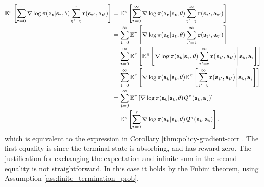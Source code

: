 \begin{equation*}
\begin{split}
    \mathbb{E}^{\pi}\left[ \sum_{{\tt t}=0}^\tau \nabla\log \pi({\tt a}_{\tt t}|{\tt s}_{\tt t},\theta) \sum_{{\tt t}'={\tt t}}^\tau {\tt r}({\tt s}_{{\tt t}'},{\tt a}_{{\tt t}'})\right] &= \mathbb{E}^{\pi}\left[ \sum_{{\tt t}=0}^\infty \nabla\log \pi({\tt a}_{\tt t}|{\tt s}_{\tt t},\theta) \sum_{{\tt t}'={\tt t}}^\infty {\tt r}({\tt s}_{{\tt t}'},{\tt a}_{{\tt t}'})\right] \\
    &= \sum_{{\tt t}=0}^\infty \mathbb{E}^{\pi}\left[ \nabla\log \pi({\tt a}_{\tt t}|{\tt s}_{\tt t},\theta) \sum_{{\tt t}'={\tt t}}^\infty {\tt r}({\tt s}_{{\tt t}'},{\tt a}_{{\tt t}'})\right] \\
    &=\sum_{{\tt t}=0}^\infty \mathbb{E}^{\pi}\left[ \mathbb{E}^{\pi}\left[ \left.\nabla\log \pi({\tt a}_{\tt t}|{\tt s}_{\tt t},\theta) \sum_{{\tt t}'={\tt t}}^\infty {\tt r}({\tt s}_{{\tt t}'},{\tt a}_{{\tt t}'})\right| {\tt s}_{\tt t}, {\tt a}_{\tt t}\right]\right] \\
    &=\sum_{{\tt t}=0}^\infty \mathbb{E}^{\pi}\left[\nabla\log \pi({\tt a}_{\tt t}|{\tt s}_{\tt t},\theta) \mathbb{E}^{\pi}\left[ \left. \sum_{{\tt t}'={\tt t}}^\infty {\tt r}({\tt s}_{{\tt t}'},{\tt a}_{{\tt t}'})\right| {\tt s}_{\tt t}, {\tt a}_{\tt t}\right]\right] \\
    &=\sum_{{\tt t}=0}^\infty \mathbb{E}^{\pi}\left[\nabla\log \pi({\tt a}_{\tt t}|{\tt s}_{\tt t},\theta) \mathcal{Q}^{\pi}({\tt s}_{\tt t}, {\tt a}_{\tt t})\right]\\
    &=\mathbb{E}^{\pi}\left[\sum_{{\tt t}=0}^\tau\nabla\log \pi({\tt a}_{\tt t}|{\tt s}_{\tt t},\theta) \mathcal{Q}^{\pi}({\tt s}_{\tt t}, {\tt a}_{\tt t})\right],
\end{split}
\end{equation*}
which is equivalent to the expression in Corollary \ref{thm:policy-gradient-corr}. The first equality is since the terminal state is absorbing, and has reward zero. The justification for exchanging the expectation and infinite sum in the second equality is not straightforward. In this case it holds by the Fubini theorem, using Assumption \ref{ass:finite_termination_prob}.

